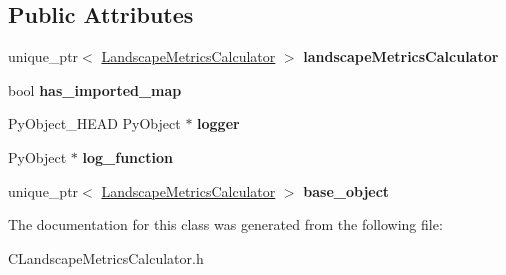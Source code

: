 \subsection*{Public Attributes}
\begin{DoxyCompactItemize}
\item 
unique\+\_\+ptr$<$ \hyperlink{class_landscape_metrics_calculator}{Landscape\+Metrics\+Calculator} $>$ {\bfseries landscape\+Metrics\+Calculator}\hypertarget{class_py_l_m_c_a7d524fa3a2eca7349d66ae8fa766670f}{}\label{class_py_l_m_c_a7d524fa3a2eca7349d66ae8fa766670f}

\item 
bool {\bfseries has\+\_\+imported\+\_\+map}\hypertarget{class_py_l_m_c_a282bf8674cb032dc0f010e037ac393c9}{}\label{class_py_l_m_c_a282bf8674cb032dc0f010e037ac393c9}

\item 
Py\+Object\+\_\+\+H\+E\+AD Py\+Object $\ast$ {\bfseries logger}\hypertarget{class_py_template_a5b741a472639d65f9bcad29afa16ec99}{}\label{class_py_template_a5b741a472639d65f9bcad29afa16ec99}

\item 
Py\+Object $\ast$ {\bfseries log\+\_\+function}\hypertarget{class_py_template_a98bb8152faa73d028342d5cf260f0372}{}\label{class_py_template_a98bb8152faa73d028342d5cf260f0372}

\item 
unique\+\_\+ptr$<$ \hyperlink{class_landscape_metrics_calculator}{Landscape\+Metrics\+Calculator} $>$ {\bfseries base\+\_\+object}\hypertarget{class_py_template_a14da655e6d3c0b398d8478058316d326}{}\label{class_py_template_a14da655e6d3c0b398d8478058316d326}

\end{DoxyCompactItemize}


The documentation for this class was generated from the following file\+:\begin{DoxyCompactItemize}
\item 
C\+Landscape\+Metrics\+Calculator.\+h\end{DoxyCompactItemize}
